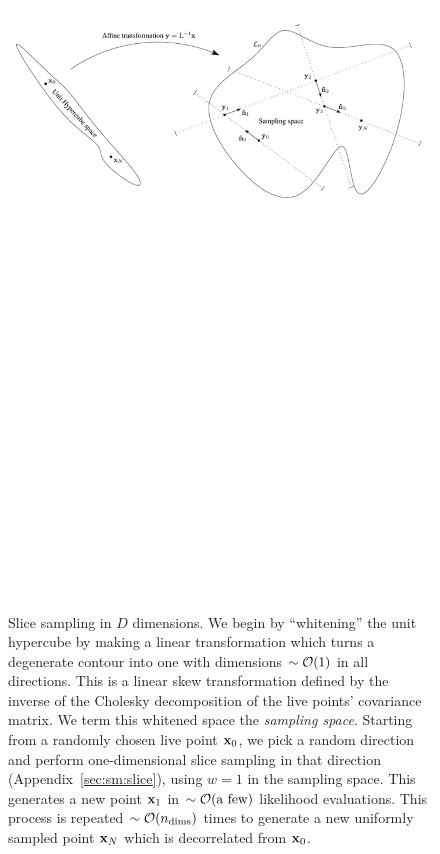 %
\begin{figure}[tp]
  \centerline{%
    \includegraphics[width=\textwidth]{chapters/polychord/figures/contour}
}
\caption{%
  Slice sampling in \(D\) dimensions. 
  We begin by ``whitening'' the unit hypercube by making a linear transformation which turns a degenerate contour into one with dimensions \({\sim\mathcal{O}{\left(1\right)}}\) in all directions. 
  This is a linear skew transformation defined by the inverse of the Cholesky decomposition of the live points' covariance matrix. 
  We term this whitened space the {\em sampling space}. 
  Starting from a randomly chosen live point \(\mathbf{x}_{0}\), we pick a random direction and perform one-dimensional slice sampling in that direction (Appendix~\protect\ref{sec:sm:slice}), using \(w=1\) in the sampling space. 
  This generates a new point \(\mathbf{x}_{1}\) in \({\sim\mathcal{O}{\left(\text{a few}\right)}}\) likelihood evaluations. 
  This process is repeated \({\sim\mathcal{O}{\left(n_{\mathrm{dims}}\right)}}\) times to generate a new uniformly sampled point \(\mathbf{x}_{N}\) which is decorrelated from \(\mathbf{x}_{0}\).\label{fig:pc:Nd_slice}
}
\end{figure}
%

